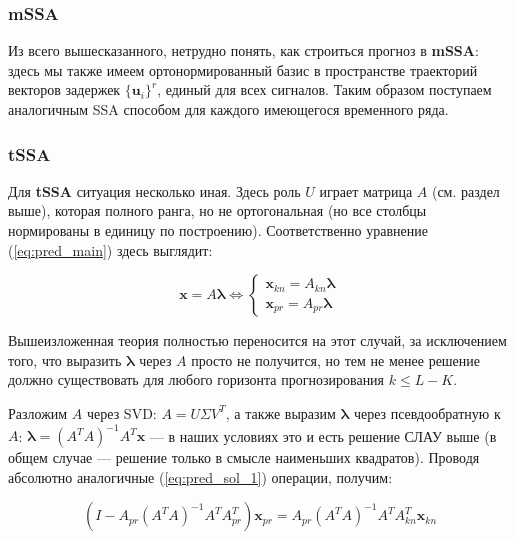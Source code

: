 			 \subsubsection*{mSSA}
			 
			 Из всего вышесказанного, нетрудно понять, как строиться прогноз в \textbf{mSSA}: здесь мы также имеем ортонормированный базис в пространстве траекторий векторов задержек $ \{\mathbf{u}_i\}^r $, единый для всех сигналов. Таким образом поступаем аналогичным SSA способом для каждого имеющегося временного ряда.
			 
			 \subsubsection*{tSSA}
			 
			 Для \textbf{tSSA} ситуация несколько иная. Здесь роль $ U $ играет матрица $ A $ (см. раздел выше), которая полного ранга, но не ортогональная (но все столбцы нормированы в единицу по построению). Соответственно уравнение (\ref{eq:pred_main}) здесь выглядит:
			 
			 \begin{equation}\label{eq:main_pred_for_A}
			 	\mathbf{x} = A \boldsymbol{\lambda} \Leftrightarrow \begin{cases*}
			 		\mathbf{x}_{kn} = A_{kn} \boldsymbol{\lambda} \\
			 		\mathbf{x}_{pr} = A_{pr} \boldsymbol{\lambda}
			 	\end{cases*}
			 \end{equation}
			 
			 Вышеизложенная теория полностью переносится на этот случай, за исключением того, что выразить $ \boldsymbol{\lambda} $ через $ A $ просто не получится, но тем не менее решение должно существовать для любого горизонта прогнозирования $ k \le L - K $.
			 
			 Разложим $ A $ через SVD: $ A = U \Sigma V^T $, а также выразим $ \boldsymbol{\lambda} $ через псевдообратную к $ A $: $ \boldsymbol{\lambda} = (A^T A)^{-1} A^T \mathbf{x} $ --- в наших условиях это и есть решение СЛАУ выше (в общем случае --- решение только в смысле наименьших квадратов). Проводя абсолютно аналогичные (\ref{eq:pred_sol_1}) операции, получим:
			 
			 \begin{equation*}
			 	(I - A_{pr} (A^T A)^{-1} A^T A_{pr}^T) \mathbf{x}_{pr} = A_{pr} (A^T A)^{-1} A^T A_{kn}^T \mathbf{x}_{kn}
			 \end{equation*}
			 
